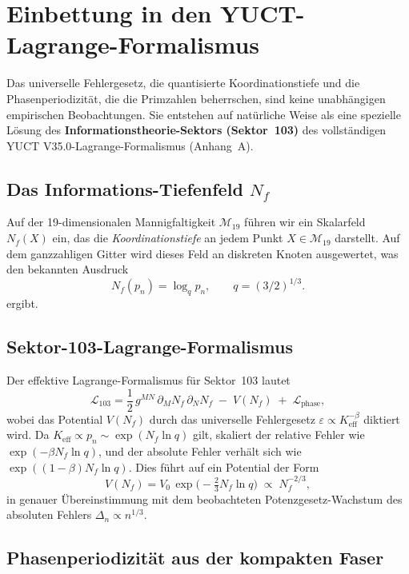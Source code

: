 \documentclass[11pt,a4paper]{article}
\begin{document}
	\section{Einbettung in den YUCT-Lagrange-Formalismus}
	\label{sec:lagrangian-embedding}
	
	Das universelle Fehlergesetz, die quantisierte Koordinationstiefe und die Phasenperiodizität, die die Primzahlen beherrschen, sind keine unabhängigen empirischen Beobachtungen. Sie entstehen auf natürliche Weise als eine spezielle Lösung des \textbf{Informationstheorie-Sektors (Sektor~103)} des vollständigen YUCT V35.0-Lagrange-Formalismus (Anhang~A).
	
	\subsection{Das Informations-Tiefenfeld \(N_f\)}
	
	Auf der 19-dimensionalen Mannigfaltigkeit \(\mathcal{M}_{19}\) führen wir ein Skalarfeld \(N_f(X)\) ein, das die \emph{Koordinationstiefe} an jedem Punkt \(X \in \mathcal{M}_{19}\) darstellt. Auf dem ganzzahligen Gitter wird dieses Feld an diskreten Knoten ausgewertet, was den bekannten Ausdruck
	\[
	N_f(p_n) = \log_q p_n, \qquad q = (3/2)^{1/3}.
	\]
	ergibt.
	
	\subsection{Sektor-103-Lagrange-Formalismus}
	
	Der effektive Lagrange-Formalismus für Sektor~103 lautet
	\begin{equation}\label{eq:L103}
		\mathcal{L}_{103} =
		\frac{1}{2}\,g^{MN}\,\partial_M N_f\,\partial_N N_f
		\;-\; V(N_f)
		\;+\; \mathcal{L}_{\text{phase}},
	\end{equation}
	wobei das Potential \(V(N_f)\) durch das universelle Fehlergesetz \(\varepsilon \propto K_{\mathrm{eff}}^{-\beta}\) diktiert wird. Da \(K_{\mathrm{eff}} \propto p_n \sim \exp(N_f \ln q)\) gilt, skaliert der relative Fehler wie \(\exp(-\beta N_f \ln q)\), und der absolute Fehler verhält sich wie \(\exp((1-\beta) N_f \ln q)\). Dies führt auf ein Potential der Form
	\[
	V(N_f) = V_0 \, \exp\!\bigl(-\tfrac{2}{3} N_f \ln q\bigr)
	\;\propto\; N_f^{-2/3},
	\]
	in genauer Übereinstimmung mit dem beobachteten Potenzgesetz-Wachstum des absoluten Fehlers \(\Delta_n \propto n^{1/3}\).
	
	\subsection{Phasenperiodizität aus der kompakten Faser}
	
\end{document}
